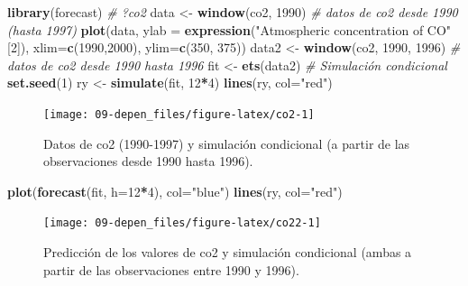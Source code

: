 \documentclass[]{book}
\newenvironment{Shaded}{\begin{snugshade}}{\end{snugshade}}
\newcommand{\KeywordTok}[1]{\textcolor[rgb]{0.13,0.29,0.53}{\textbf{#1}}}
\newcommand{\DataTypeTok}[1]{\textcolor[rgb]{0.13,0.29,0.53}{#1}}
\newcommand{\DecValTok}[1]{\textcolor[rgb]{0.00,0.00,0.81}{#1}}
\newcommand{\StringTok}[1]{\textcolor[rgb]{0.31,0.60,0.02}{#1}}
\newcommand{\CommentTok}[1]{\textcolor[rgb]{0.56,0.35,0.01}{\textit{#1}}}
\newcommand{\OperatorTok}[1]{\textcolor[rgb]{0.81,0.36,0.00}{\textbf{#1}}}
\newcommand{\NormalTok}[1]{#1}
\theoremstyle{definition}
\theoremstyle{definition}
\theoremstyle{definition}
\theoremstyle{remark}
\begin{document}
\begin{Shaded}
\begin{Highlighting}[]
\KeywordTok{library}\NormalTok{(forecast)}
\CommentTok{# ?co2}
\NormalTok{data <-}\StringTok{ }\KeywordTok{window}\NormalTok{(co2, }\DecValTok{1990}\NormalTok{) }\CommentTok{# datos de co2 desde 1990 (hasta 1997)}
\KeywordTok{plot}\NormalTok{(data, }\DataTypeTok{ylab =} \KeywordTok{expression}\NormalTok{(}\StringTok{"Atmospheric concentration of CO"}\NormalTok{[}\DecValTok{2}\NormalTok{]), }
     \DataTypeTok{xlim=}\KeywordTok{c}\NormalTok{(}\DecValTok{1990}\NormalTok{,}\DecValTok{2000}\NormalTok{), }\DataTypeTok{ylim=}\KeywordTok{c}\NormalTok{(}\DecValTok{350}\NormalTok{, }\DecValTok{375}\NormalTok{))}
\NormalTok{data2 <-}\StringTok{ }\KeywordTok{window}\NormalTok{(co2, }\DecValTok{1990}\NormalTok{, }\DecValTok{1996}\NormalTok{) }\CommentTok{# datos de co2 desde 1990 hasta 1996}
\NormalTok{fit <-}\StringTok{ }\KeywordTok{ets}\NormalTok{(data2)}
\CommentTok{# Simulación condicional}
\KeywordTok{set.seed}\NormalTok{(}\DecValTok{1}\NormalTok{)}
\NormalTok{ry <-}\StringTok{ }\KeywordTok{simulate}\NormalTok{(fit, }\DecValTok{12}\OperatorTok{*}\DecValTok{4}\NormalTok{)}
\KeywordTok{lines}\NormalTok{(ry, }\DataTypeTok{col=}\StringTok{"red"}\NormalTok{)}
\end{Highlighting}
\end{Shaded}

\begin{figure}[!htb]

{\centering \texttt{[image: 09-depen\_files/figure-latex/co2-1]} 

}

\caption{Datos de co2 (1990-1997) y simulación condicional (a partir de las observaciones desde 1990 hasta 1996).}\label{fig:co2}
\end{figure}

\begin{Shaded}
\begin{Highlighting}[]
\KeywordTok{plot}\NormalTok{(}\KeywordTok{forecast}\NormalTok{(fit, }\DataTypeTok{h=}\DecValTok{12}\OperatorTok{*}\DecValTok{4}\NormalTok{), }\DataTypeTok{col=}\StringTok{"blue"}\NormalTok{)}
\KeywordTok{lines}\NormalTok{(ry, }\DataTypeTok{col=}\StringTok{"red"}\NormalTok{)}
\end{Highlighting}
\end{Shaded}

\begin{figure}[!htb]

{\centering \texttt{[image: 09-depen\_files/figure-latex/co22-1]} 

}

\caption{Predicción de los valores de co2 y simulación condicional (ambas a partir de las observaciones entre 1990 y 1996).}\label{fig:co22}
\end{figure}
\end{document}

